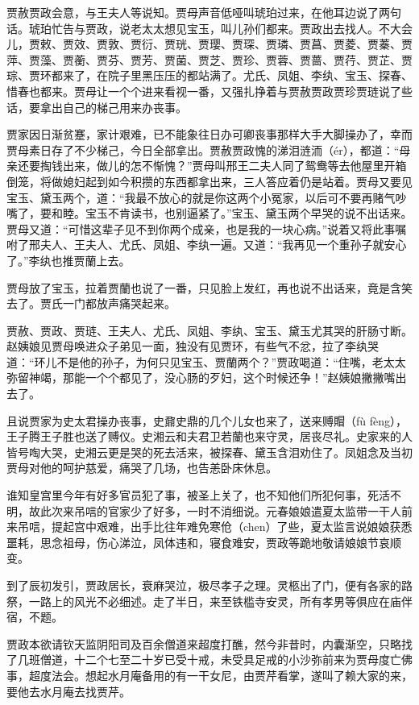 \documentclass[12pt,oneside]{book}
\begin{document}
贾赦贾政会意，与王夫人等说知。贾母声音低哑叫琥珀过来，在他耳边说了两句话。琥珀忙告与贾政，说老太太想见宝玉，叫儿孙们都来。贾政出去找人。不大会儿，贾敕、贾效、贾敦、贾衍、贾珖、贾璎、贾琛、贾璘、贾菖、贾菱、贾蓁、贾萍、贾藻、贾蘅、贾芬、贾芳、贾菌、贾芝、贾珍、贾蓉、贾蔷、贾荇、贾芷、贾琮、贾环都来了，在院子里黑压压的都站满了。尤氏、凤姐、李纨、宝玉、探春、惜春也都来。贾母让一个个进来看视一番，又强扎挣着与贾赦贾政贾珍贾琏说了些话，要拿出自己的梯己用来办丧事。

贾家因日渐贫蹇，家计艰难，已不能象往日办可卿丧事那样大手大脚操办了，幸而贾母素日存了不少梯己，今日全部拿出。贾赦贾政愧的涕泪涟洏（ér），都道：“母亲还要掏钱出来，做儿的怎不惭愧？”贾母叫邢王二夫人同了鸳鸯等去他屋里开箱倒笼，将做媳妇起到如今积攒的东西都拿出来，三人答应着仍是站着。贾母又要见宝玉、黛玉两个，道：“我最不放心的就是你这两个小冤家，以后可不要再赌气吵嘴了，要和睦。宝玉不肯读书，也别逼紧了。”宝玉、黛玉两个早哭的说不出话来。贾母又道：“可惜这辈子见不到你两个成亲，也是我的一块心病。”说着又将此事嘱咐了邢夫人、王夫人、尤氏、凤姐、李纨一遍。又道：“我再见一个重孙子就安心了。”李纨也推贾蘭上去。

贾母放了宝玉，拉着贾蘭也说了一番，只见脸上发红，再也说不出话来，竟是含笑去了。贾氏一门都放声痛哭起来。

贾赦、贾政、贾琏、王夫人、尤氏、凤姐、李纨、宝玉、黛玉尤其哭的肝肠寸断。赵姨娘见贾母唤进众子弟见一面，独没有见贾环，有些气不忿，拉了李纨哭道：“环儿不是他的孙子，为何只见宝玉、贾蘭两个？”贾政喝道：“住嘴，老太太弥留神竭，那能一个个都见了，没心肠的歹妇，这个时候还争！”赵姨娘撇撇嘴出去了。

且说贾家为史太君操办丧事，史鼐史鼎的几个儿女也来了，送来赙賵（fù fèng），王子腾王子胜也送了赙仪。史湘云和夫君卫若蘭也来守灵，居丧尽礼。史家来的人皆号啕大哭，史湘云更是哭的死去活来，被探春、黛玉含泪劝住了。凤姐念及当初贾母对他的呵护慈爱，痛哭了几场，也告恙卧床休息。

谁知皇宫里今年有好多官员犯了事，被圣上关了，也不知他们所犯何事，死活不明，故此次来吊唁的官家少了好多，一时不消细说。元春娘娘遣夏太监带一干人前来吊唁，提起宫中艰难，出手比往年难免寒伧（chen）了些，夏太监言说娘娘获悉噩耗，思念祖母，伤心涕泣，凤体违和，寝食难安，贾政等跪地敬请娘娘节哀顺变。

到了辰初发引，贾政居长，衰麻哭泣，极尽孝子之理。灵柩出了门，便有各家的路祭，一路上的风光不必细述。走了半日，来至铁槛寺安灵，所有孝男等俱应在庙伴宿，不题。

贾政本欲请钦天监阴阳司及百余僧道来超度打醮，然今非昔时，内囊渐空，只略找了几班僧道，十二个七至二十岁已受十戒，未受具足戒的小沙弥前来为贾母度亡佛事，超度法会。想起水月庵备用的有一干女尼，由贾芹看掌，遂叫了赖大家的来，要他去水月庵去找贾芹。
\end{document}

